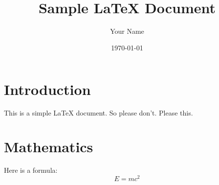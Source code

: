 \documentclass{article}
\begin{document}
\title{Sample LaTeX Document}
\author{Your Name}
\date{\today}
\maketitle

\section{Introduction}
This is a simple LaTeX document. So please don't. Please this.

\section{Mathematics}
Here is a formula:
\[
E = mc^2
\]
\end{document}
